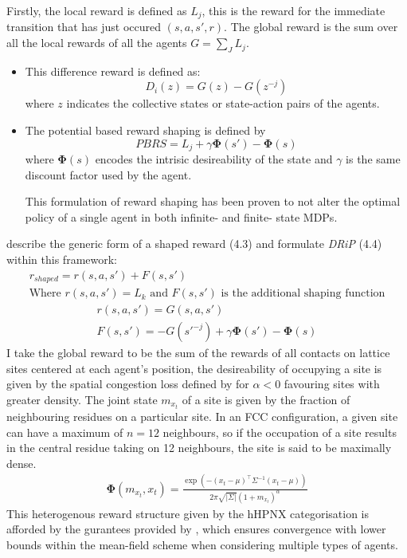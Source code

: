 Firstly, the local reward is defined as $L_j$, this is the reward for the immediate transition
that has just occured $(s,a,s',r)$. The global reward is the sum over all the local rewards of all the agents
$G = \sum_J L_j$.
\begin{itemize}
    \item This difference reward is defined as: \[D_i(z) = G(z) - G(z^{-j})\] where $z$ indicates
    the collective states or state-action pairs of the agents.
    \item The potential based reward shaping is defined by \[PBRS = L_j + \gamma \boldsymbol \Phi(s') - \boldsymbol \Phi(s)\]
    where $\boldsymbol \Phi(s)$ encodes the intrisic desireability of the state and $\gamma$ is the same discount
    factor used by the agent. 
    \begin{displayquote}
        This formulation of reward shaping has been proven to not
        alter the optimal policy of a single agent in both infinite- and finite- state MDPs. 
    \end{displayquote}
\end{itemize}
\cite{Devlin2014} describe the generic form of a shaped reward (4.3) and formulate \emph{DRiP} (4.4) within this framework:
\begin{equation}
    \begin{gathered}
        r_{shaped} = r(s,a,s') + F(s,s')\\
        \text{Where $r(s,a,s') = L_k$ and $F(s,s')$ is the additional shaping function}
    \end{gathered}
\end{equation}
\begin{equation}
    \begin{gathered}
        r(s,a,s') = G(s,a,s')\\
        F(s,s') = -G(s'^{-j}) + \gamma \boldsymbol \Phi(s') - \boldsymbol \Phi(s)
    \end{gathered}
\end{equation}
I take the global reward to be the sum of the rewards of all contacts on lattice
sites centered at each agent's position, the desireability of occupying a site
is given by the spatial congestion loss defined by \cite{Mguni2018} for $\alpha < 0$
favouring sites with greater density. The joint state $m_{x_t}$ of a site is given
by the fraction of neighbouring residues on a particular site. In an FCC configuration,
a given site can have a maximum of $n = 12$ neighbours, so if the occupation of a site
results in the central residue taking on 12 neighbours, the site is said to be maximally dense.
\begin{equation}
    \begin{gathered}
        \boldsymbol \Phi(m_{x_t}, x_t) = \frac{\exp (-(x_t - \mu)^\top \Sigma^{-1} (x_t - \mu))}{2 \pi \sqrt{\vert \Sigma \vert}(1 + m_{x_t})^\alpha}
    \end{gathered}
\end{equation}
This heterogenous reward structure given by the hHPNX categorisation
is afforded by the gurantees provided by \cite{Sriram2020},
which ensures convergence with lower bounds within the mean-field scheme when considering 
multiple types of agents.                
